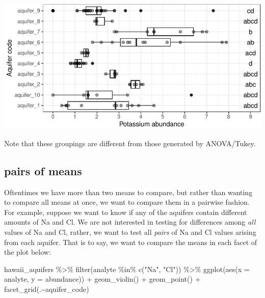 \documentclass[
]{krantz}
\newenvironment{Shaded}{\begin{snugshade}}{\end{snugshade}}
\newcommand{\AttributeTok}[1]{\textcolor[rgb]{0.77,0.63,0.00}{#1}}
\newcommand{\FunctionTok}[1]{\textcolor[rgb]{0.00,0.00,0.00}{#1}}
\newcommand{\NormalTok}[1]{#1}
\newcommand{\SpecialCharTok}[1]{\textcolor[rgb]{0.00,0.00,0.00}{#1}}
\newcommand{\StringTok}[1]{\textcolor[rgb]{0.31,0.60,0.02}{#1}}
\begin{document}
\begin{center}\includegraphics{index_files/figure-latex/unnamed-chunk-151-1} \end{center}

Note that these groupings are different from those generated by ANOVA/Tukey.

\hypertarget{pairs-of-means}{%
\subsection{pairs of means}\label{pairs-of-means}}

Oftentimes we have more than two means to compare, but rather than wanting to compare all means at once, we want to compare them in a pairwise fashion. For example, suppose we want to know if any of the aquifers contain different amounts of Na and Cl. We are not interested in testing for differences among \emph{all} values of Na and Cl, rather, we want to test all \emph{pairs} of Na and Cl values arising from each aquifer. That is to say, we want to compare the means in each facet of the plot below:

\begin{Shaded}
\begin{Highlighting}[]
\NormalTok{hawaii\_aquifers }\SpecialCharTok{\%\textgreater{}\%}
  \FunctionTok{filter}\NormalTok{(analyte }\SpecialCharTok{\%in\%} \FunctionTok{c}\NormalTok{(}\StringTok{"Na"}\NormalTok{, }\StringTok{"Cl"}\NormalTok{)) }\SpecialCharTok{\%\textgreater{}\%}
  \FunctionTok{ggplot}\NormalTok{(}\FunctionTok{aes}\NormalTok{(}\AttributeTok{x =}\NormalTok{ analyte, }\AttributeTok{y =}\NormalTok{ abundance)) }\SpecialCharTok{+} \FunctionTok{geom\_violin}\NormalTok{() }\SpecialCharTok{+} \FunctionTok{geom\_point}\NormalTok{() }\SpecialCharTok{+} \FunctionTok{facet\_grid}\NormalTok{(.}\SpecialCharTok{\textasciitilde{}}\NormalTok{aquifer\_code)}
\end{Highlighting}
\end{Shaded}
\end{document}
